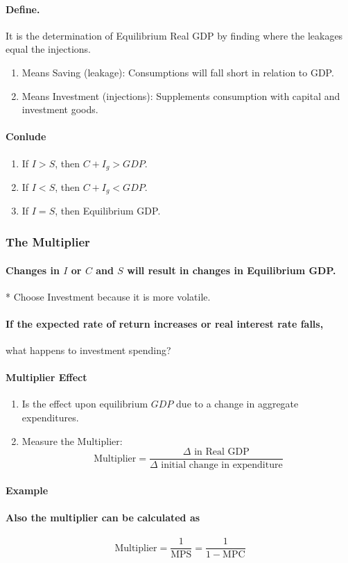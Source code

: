 \paragraph{Define.} It is the determination of Equilibrium Real GDP by finding where the leakages equal the injections.

\begin{enumerate}[label = (\alph*)]
	\item Means Saving (leakage): Consumptions will fall short in relation to GDP.
	\item Means Investment (injections): Supplements consumption with capital and investment goods. 
\end{enumerate}

\paragraph{Conlude}
\begin{enumerate}[label = \textbullet]
	\item If $I > S$, then $C + I_g > GDP$.
	\item If $I < S$, then $C + I_g < GDP$.
	\item If $I = S$, then Equilibrium GDP.
\end{enumerate}

\subsubsection{The Multiplier}
\paragraph{Changes in $I$ or $C$ and $S$ will result in changes in Equilibrium GDP.}
* Choose Investment because it is more volatile.

\paragraph{If the expected rate of return increases or real interest rate falls,} what happens to investment spending?

\paragraph{Multiplier Effect}
\begin{enumerate}[label = \textbullet]
	\item Is the effect upon equilibrium $GDP$ due to a change in aggregate expenditures.
	\item Measure the Multiplier:
		\[
			\text{Multiplier} = \frac{\Delta \text{ in Real GDP}}{\Delta \text{ initial change in expenditure}}
		\]
\end{enumerate}

\paragraph{Example}

\paragraph{Also the multiplier can be calculated as} \[
	\text{Multiplier} = \frac{1}{\text{MPS}} = \frac{1}{1 - \text{MPC}} 
\]
